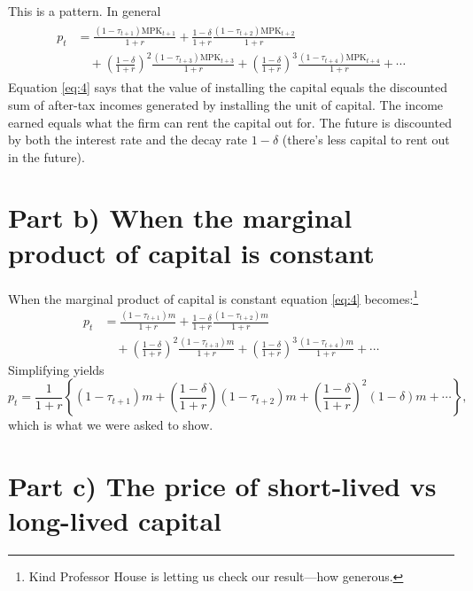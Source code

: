 \documentclass[12pt]{pracjourn_rwr}
\theoremstyle{definition}
\theoremstyle{remark}
\begin{document}
This is a pattern.
In general
\begin{align}
\label{eq:4}
\begin{split}
p_{t} &= \frac{(1-\tau_{t+1}) \text{MPK}_{t+1}}{1+r} + \frac{1-\delta}{1+r} \frac{(1-\tau_{t+2}) \text{MPK}_{t+2}}{1+r} \\
&\quad + \left( \frac{1-\delta}{1+r}  \right)^{2} \frac{(1-\tau_{t+3}) \text{MPK}_{t+3}}{1+r}
+ \left( \frac{1-\delta}{1+r}  \right)^{3} \frac{(1-\tau_{t+4}) \text{MPK}_{t+4}}{1+r} + \cdots
\end{split}
\end{align}
Equation \eqref{eq:4} says that the value of installing the capital equals the discounted sum of after-tax incomes generated by installing the unit of capital.
The income earned equals what the firm can rent the capital out for.
The future is discounted by both the interest rate and the decay rate $1-\delta$ (there's less capital to rent out in the future).

\section{Part b) When the marginal product of capital is constant}

When the marginal product of capital is constant equation \eqref{eq:4} becomes:\footnote{Kind Professor House is letting us check our result---how generous.}
\begin{align*}
p_{t} &= \frac{(1-\tau_{t+1}) m}{1+r} + \frac{1-\delta}{1+r} \frac{(1-\tau_{t+2}) m}{1+r} \\
&\quad + \left( \frac{1-\delta}{1+r}  \right)^{2} \frac{(1-\tau_{t+3}) m}{1+r}
+ \left( \frac{1-\delta}{1+r}  \right)^{3} \frac{(1-\tau_{t+4}) m}{1+r} + \cdots
\end{align*}
Simplifying yields
\begin{equation}
\label{eq:5}
p_{t} = \frac{1}{1+r} \left\{
(1-\tau_{t+1})m + \left( \frac{1-\delta}{1+r} \right) (1-\tau_{t+2})m + \left( \frac{1-\delta}{1+r} \right)^{2}(1-\delta) m + \cdots
\right\},
\end{equation}
which is what we were asked to show.

\section{Part c) The price of short-lived vs long-lived capital}
\end{document}
